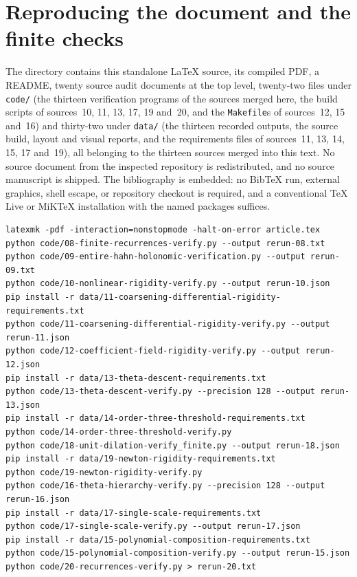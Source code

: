 \documentclass[11pt]{article}
\numberwithin{equation}{section}
\theoremstyle{definition}
\theoremstyle{remark}
\begin{document}
\section{Reproducing the document and the finite checks}
\label{hol:app:reproduce}

The directory contains this standalone \LaTeX{} source, its compiled PDF, a
README, twenty source audit documents at the top level, twenty-two files under
\texttt{code/} (the thirteen verification programs of the sources merged here,
the build scripts of sources~10, 11, 13, 17, 19 and~20, and the
\texttt{Makefile}s of sources~12, 15 and~16) and thirty-two under
\texttt{data/} (the thirteen recorded outputs, the source build, layout and
visual reports, and the requirements files of sources~11, 13, 14, 15, 17
and~19), all belonging to the thirteen sources merged into this text. No source
document from the
inspected repository is redistributed, and no source manuscript is shipped. The bibliography is embedded: no BibTeX run, external
graphics, shell escape, or repository checkout is required, and a conventional
TeX Live or MiKTeX installation with the named packages suffices.

\begin{verbatim}
latexmk -pdf -interaction=nonstopmode -halt-on-error article.tex
python code/08-finite-recurrences-verify.py --output rerun-08.txt
python code/09-entire-hahn-holonomic-verification.py --output rerun-09.txt
python code/10-nonlinear-rigidity-verify.py --output rerun-10.json
pip install -r data/11-coarsening-differential-rigidity-requirements.txt
python code/11-coarsening-differential-rigidity-verify.py --output rerun-11.json
python code/12-coefficient-field-rigidity-verify.py --output rerun-12.json
pip install -r data/13-theta-descent-requirements.txt
python code/13-theta-descent-verify.py --precision 128 --output rerun-13.json
pip install -r data/14-order-three-threshold-requirements.txt
python code/14-order-three-threshold-verify.py
python code/18-unit-dilation-verify_finite.py --output rerun-18.json
pip install -r data/19-newton-rigidity-requirements.txt
python code/19-newton-rigidity-verify.py
python code/16-theta-hierarchy-verify.py --precision 128 --output rerun-16.json
pip install -r data/17-single-scale-requirements.txt
python code/17-single-scale-verify.py --output rerun-17.json
pip install -r data/15-polynomial-composition-requirements.txt
python code/15-polynomial-composition-verify.py --output rerun-15.json
python code/20-recurrences-verify.py > rerun-20.txt
\end{verbatim}
\end{document}
